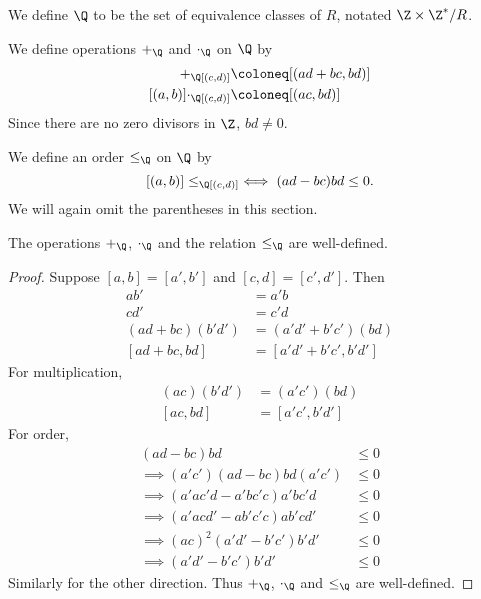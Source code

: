 \begin{definition}
    We define $\Q$ to be the set of equivalence classes of $R$, notated
    $\Z \times \Z^* / R$.
\end{definition}
We define operations $+_\Q$ and $\cdot_\Q$ on $\Q$ by
\begin{align*}
    [(a, b)] +_\Q [(c, d)] &\coloneq [(ad + bc, bd)] \\
    [(a, b)] \cdot_\Q [(c, d)] &\coloneq [(ac, bd)]
\end{align*}
Since there are no zero divisors in $\Z$, $bd \neq 0$.

We define an order $\le_\Q$ on $\Q$ by \[
    [(a, b)] \le_\Q [(c, d)] \iff (ad - bc) bd \le 0.
\]
We will again omit the parentheses in this section.
\begin{proposition}
    The operations $+_\Q$, $\cdot_\Q$ and the relation $\le_\Q$ are well-defined.
\end{proposition}
\begin{proof}
    Suppose $[a, b] = [a', b']$ and $[c, d] = [c', d']$.
    Then \begin{align*}
        ab' &= a'b \\
        cd' &= c'd \\
        (ad + bc)(b'd') &= (a'd' + b'c')(bd) \\
        [ad + bc, bd] &= [a'd' + b'c', b'd']
    \end{align*}
    For multiplication, \begin{align*}
        (ac)(b'd') &= (a'c')(bd) \\
        [ac, bd] &= [a'c', b'd']
    \end{align*}
    For order, \begin{align*}
        (ad - bc) bd &\le 0 \\
        \implies (a'c')(ad - bc) bd (a'c') &\le 0 \\
        \implies (a'ac'd - a'bc'c) a'bc'd &\le 0 \\
        \implies (a'acd' - ab'c'c) ab'cd' &\le 0 \\
        \implies (ac)^2 (a'd' - b'c') b'd' &\le 0 \\
        \implies (a'd' - b'c') b'd' &\le 0
    \end{align*}
    Similarly for the other direction.
    Thus $+_\Q$, $\cdot_\Q$ and $\le_\Q$ are well-defined.
\end{proof}
